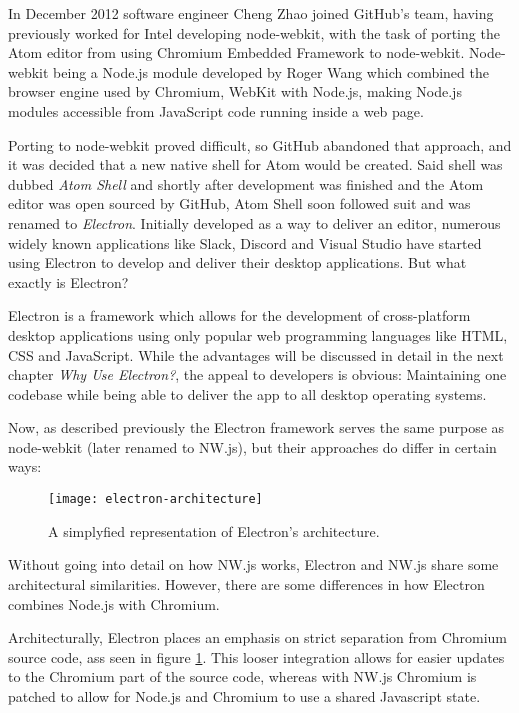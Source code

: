In December 2012 software engineer Cheng Zhao joined GitHub's team, having previously worked for Intel developing
node-webkit, with the task of porting the Atom editor from using Chromium Embedded Framework to node-webkit.
Node-webkit being a Node.js module developed by Roger Wang which combined the browser engine used by Chromium, WebKit 
with Node.js, making Node.js modules accessible from JavaScript code running inside a web page.\cite{jensen2017}\par

Porting to node-webkit proved difficult, so GitHub abandoned that approach, and it was decided that a new native shell
for Atom would be created.
Said shell was dubbed \emph{Atom Shell} and shortly after development was finished and the Atom editor was open sourced
by GitHub, Atom Shell soon followed suit and was renamed to \emph{Electron}.
Initially developed as a way to deliver an editor, numerous widely known applications like Slack, Discord and Visual
Studio have started using Electron to develop and deliver their desktop applications.
But what exactly is Electron?\par
Electron is a framework which allows for the development of cross-platform desktop applications using only popular 
web programming languages like HTML, CSS and JavaScript. 
While the advantages will be discussed in detail in the next chapter \emph{Why Use Electron?}, the appeal to developers
is obvious: Maintaining one codebase while being able to deliver the app to all desktop operating systems.\par
Now, as described previously the Electron framework serves the same purpose as node-webkit (later renamed to NW.js), but
their approaches do differ in certain ways:\cite{jensen2017}
\begin{figure}[ht]
    \label{fig:el-architecture}
    \caption{A simplyfied representation of Electron's architecture.\cite{jensen2017}}
    \texttt{[image: electron-architecture]}
\end{figure}
Without going into detail on how NW.js works, Electron and NW.js share some architectural similarities.
However, there are some differences in how Electron combines Node.js with Chromium.\par
Architecturally, Electron places an emphasis on strict separation from Chromium source code, ass seen in figure \ref{fig:el-architecture}.
This looser integration allows for easier updates to the Chromium part of the source code, whereas with NW.js Chromium
is patched to allow for Node.js and Chromium to use a shared Javascript state.\cite{jensen2017}
